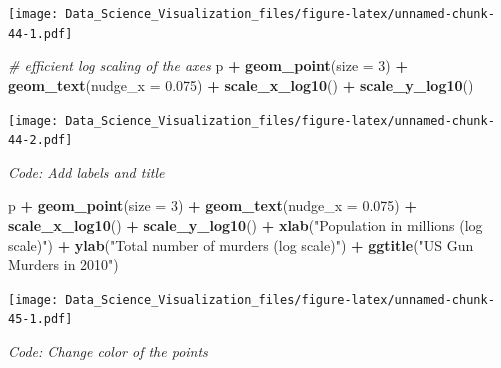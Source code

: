 \documentclass[
]{article}
\newenvironment{Shaded}{\begin{snugshade}}{\end{snugshade}}
\newcommand{\CommentTok}[1]{\textcolor[rgb]{0.56,0.35,0.01}{\textit{#1}}}
\newcommand{\DataTypeTok}[1]{\textcolor[rgb]{0.13,0.29,0.53}{#1}}
\newcommand{\DecValTok}[1]{\textcolor[rgb]{0.00,0.00,0.81}{#1}}
\newcommand{\FloatTok}[1]{\textcolor[rgb]{0.00,0.00,0.81}{#1}}
\newcommand{\KeywordTok}[1]{\textcolor[rgb]{0.13,0.29,0.53}{\textbf{#1}}}
\newcommand{\NormalTok}[1]{#1}
\newcommand{\OperatorTok}[1]{\textcolor[rgb]{0.81,0.36,0.00}{\textbf{#1}}}
\newcommand{\StringTok}[1]{\textcolor[rgb]{0.31,0.60,0.02}{#1}}
\begin{document}
\texttt{[image: Data\_Science\_Visualization\_files/figure-latex/unnamed-chunk-44-1.pdf]}

\begin{Shaded}
\begin{Highlighting}[]
\CommentTok{# efficient log scaling of the axes}
\NormalTok{p }\OperatorTok{+}\StringTok{ }\KeywordTok{geom_point}\NormalTok{(}\DataTypeTok{size =} \DecValTok{3}\NormalTok{) }\OperatorTok{+}
\StringTok{    }\KeywordTok{geom_text}\NormalTok{(}\DataTypeTok{nudge_x =} \FloatTok{0.075}\NormalTok{) }\OperatorTok{+}
\StringTok{    }\KeywordTok{scale_x_log10}\NormalTok{() }\OperatorTok{+}
\StringTok{    }\KeywordTok{scale_y_log10}\NormalTok{()}
\end{Highlighting}
\end{Shaded}

\texttt{[image: Data\_Science\_Visualization\_files/figure-latex/unnamed-chunk-44-2.pdf]}

\emph{Code: Add labels and title}

\begin{Shaded}
\begin{Highlighting}[]
\NormalTok{p }\OperatorTok{+}\StringTok{ }\KeywordTok{geom_point}\NormalTok{(}\DataTypeTok{size =} \DecValTok{3}\NormalTok{) }\OperatorTok{+}
\StringTok{    }\KeywordTok{geom_text}\NormalTok{(}\DataTypeTok{nudge_x =} \FloatTok{0.075}\NormalTok{) }\OperatorTok{+}
\StringTok{    }\KeywordTok{scale_x_log10}\NormalTok{() }\OperatorTok{+}
\StringTok{    }\KeywordTok{scale_y_log10}\NormalTok{() }\OperatorTok{+}
\StringTok{    }\KeywordTok{xlab}\NormalTok{(}\StringTok{"Population in millions (log scale)"}\NormalTok{) }\OperatorTok{+}
\StringTok{    }\KeywordTok{ylab}\NormalTok{(}\StringTok{"Total number of murders (log scale)"}\NormalTok{) }\OperatorTok{+}
\StringTok{    }\KeywordTok{ggtitle}\NormalTok{(}\StringTok{"US Gun Murders in 2010"}\NormalTok{)}
\end{Highlighting}
\end{Shaded}

\texttt{[image: Data\_Science\_Visualization\_files/figure-latex/unnamed-chunk-45-1.pdf]}

\emph{Code: Change color of the points}
\end{document}
